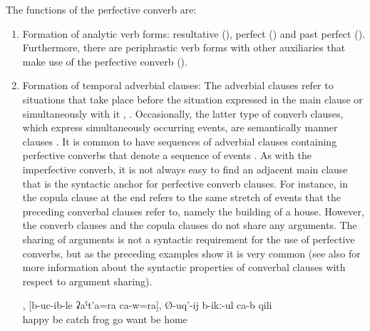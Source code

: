 The functions of the perfective converb are:
%
\begin{enumerate}
	\item	Formation of analytic verb forms: resultative (), perfect () and past perfect (). Furthermore, there are periphrastic verb forms with other auxiliaries that make use of the perfective converb ().

	\item	Formation of temporal adverbial clauses: The adverbial clauses refer to situations that take place before the situation expressed in the main clause or simultaneously with it , . Occasionally, the latter type of converb clauses, which express simultaneously occurring events, are semantically manner clauses . It is common to have sequences of adverbial clauses containing perfective converbs that denote a sequence of events . As with the imperfective converb, it is not always easy to find an adjacent main clause that is the syntactic anchor for perfective converb clauses. For instance, in  the copula clause at the end refers to the same stretch of events that the preceding converbal clauses refer to, namely the building of a house. However, the converb clauses and the copula clauses do not share any arguments. The sharing of arguments is not a syntactic requirement for the use of perfective converbs, but as the preceding examples  show it is very common (see also  for more information about the syntactic properties of converbal clauses with respect to argument sharing).
	\begin{exe}
		\ex	\label{ex:‎He got happy, caught his frog, and wants to go home}
		\gll	[razi	Ø-iχ-ub-le],	[b-uc-ib-le	ʡaˁt'a=ra	ca-w=ra],	Ø-uq'-ij	b-ikː-ul	ca-b	qili\\
			happy	be	catch	frog		go	want	be	home\\
		\glt	{}


\end{exe}
\end{enumerate}
